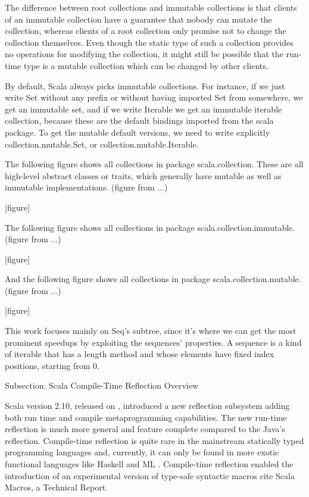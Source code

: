 The difference between root collections and immutable collections is that
clients of an immutable collection have a guarantee that nobody can mutate the
collection, whereas clients of a root collection only promise not to change the
collection themselves. Even though the static type of such a collection provides
no operations for modifying the collection, it might still be possible that the
run-time type is a mutable collection which can be changed by other clients.

By default, Scala always picks immutable collections. For instance, if we just
write Set without any prefix or without having imported Set from somewhere, we
get an immutable set, and if we write Iterable we get an immutable iterable
collection, because these are the default bindings imported from the scala
package. To get the mutable default versions, we need to write explicitly
collection.mutable.Set, or collection.mutable.Iterable.

The following figure shows all collections in package scala.collection. These
are all high-level abstract classes or traits, which generally have mutable as
well as immutable implementations. (figure from ...)

[figure]

The following figure shows all collections in package
scala.collection.immutable. (figure from ...)

[figure]

And the following figure shows all collections in package
scala.collection.mutable. (figure from ...)

[figure]

This work focuses mainly on Seq's subtree, since it's where we can get the
most prominent speedups by exploiting the sequences' properties. A sequence is a
kind of iterable that has a length method and whose elements have fixed index
positions, starting from 0.


Subsection: Scala Compile-Time Reflection Overview

Scala version 2.10, released on , introduced a new reflection
subsystem adding both run time and compile metaprogramming capabilities. The new
run-time reflection is much more general and feature complete compared to the
Java's reflection. Compile-time reflection is quite rare in the mainstream
statically typed programming languages and, currently, it can only be found in
more exotic functional languages like Haskell 
and ML . Compile-time reflection enabled the introduction
of an experimental version of type-safe syntactic macros {cite Scala Macros, a
Technical Report}. 

